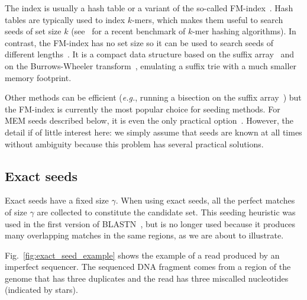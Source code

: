 \documentclass{article}
\begin{document}
The index is usually a hash table or a variant of the so-called
FM-index~\cite{pmid20460430}. Hash tables are typically used to index
$k$-mers, which makes them useful to search seeds of set size $k$
(see~\cite{pmid30346548} for a recent benchmark of $k$-mer hashing
algorithms). In contrast, the FM-index has no set size so it can be used
to search seeds of different lengths~\cite{ferragina2000opportunistic,
ferragina2005indexing}. It is a compact data structure based on the suffix
array~\cite{manber1993suffix} and on the Burrows-Wheeler
transform~\cite{burrows1994block}, emulating a suffix trie with a much
smaller memory footprint.

Other methods can be efficient (\textit{e.g.}, running a bisection on the
suffix array~\cite{dobin2013star}) but the FM-index is currently the most
popular choice for seeding methods. For MEM seeds described below, it is
even the only practical option~\cite{pmid24336412, pmid25399029,
pmid23349213, pmid19389736}. However, the detail if of little interest
here: we simply assume that seeds are known at all times without ambiguity
because this problem has several practical solutions.


\subsection{Exact seeds}

Exact seeds have a fixed size $\gamma$. When using exact seeds, all the
perfect matches of size $\gamma$ are collected to constitute the candidate
set. This seeding heuristic was used in the first version of
BLASTN~\cite{pmid2231712}, but is no longer used because it produces many
overlapping matches in the same regions, as we are about to illustrate.

Fig.~\ref{fig:exact_seed_example} shows the example of a read produced
by an imperfect sequencer. The sequenced DNA fragment comes from a region
of the genome that has three duplicates and the read has three miscalled
nucleotides (indicated by stars).
\end{document}
